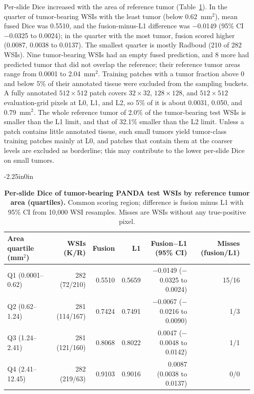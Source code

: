 \documentclass[10pt,letterpaper]{article}
\begin{document}
Per-slide Dice increased with the area of reference tumor (Table~\ref{tab:size}). In the quarter of tumor-bearing WSIs with the least tumor (below 0.62~mm$^2$), mean fused Dice was 0.5510, and the fusion-minus-L1 difference was $-$0.0149 (95\% CI $-$0.0325 to 0.0024); in the quarter with the most tumor, fusion scored higher (0.0087, 0.0038 to 0.0137). The smallest quarter is mostly Radboud (210 of 282 WSIs). Nine tumor-bearing WSIs had an empty fused prediction, and 8 more had predicted tumor that did not overlap the reference; their reference tumor areas range from 0.0001 to 2.04~mm$^2$. Training patches with a tumor fraction above 0 and below 5\% of their annotated tissue were excluded from the sampling buckets. A fully annotated $512\times512$ patch covers $32\times32$, $128\times128$, and $512\times512$ evaluation-grid pixels at L0, L1, and L2, so 5\% of it is about 0.0031, 0.050, and 0.79~mm$^2$. The whole reference tumor of 2.0\% of the tumor-bearing test WSIs is smaller than the L1 limit, and that of 32.1\% smaller than the L2 limit. Unless a patch contains little annotated tissue, such small tumors yield tumor-class training patches mainly at L0, and patches that contain them at the coarser levels are excluded as borderline; this may contribute to the lower per-slide Dice on small tumors.

\begin{table}[H]\begin{adjustwidth}{-2.25in}{0in}\centering
\caption{\textbf{Per-slide Dice of tumor-bearing PANDA test WSIs by reference tumor area (quartiles).} Common scoring region; difference is fusion minus L1 with 95\% CI from 10,000 WSI resamples. Misses are WSIs without any true-positive pixel.}\label{tab:size}
\begin{tabular}{lrrrrrr}\toprule
Area quartile (mm$^2$) & WSIs (K/R) & Fusion & L1 & Fusion$-$L1 (95\% CI) & Misses (fusion/L1)\\\midrule
Q1 (0.0001--0.62) & 282 (72/210) & 0.5510 & 0.5659 & $-$0.0149 ($-$0.0325 to 0.0024) & 15/16\\
Q2 (0.62--1.24) & 281 (114/167) & 0.7424 & 0.7491 & $-$0.0067 ($-$0.0216 to 0.0090) & 1/3\\
Q3 (1.24--2.41) & 281 (121/160) & 0.8068 & 0.8022 & 0.0047 ($-$0.0048 to 0.0142) & 1/1\\
Q4 (2.41--12.45) & 282 (219/63) & 0.9103 & 0.9016 & 0.0087 (0.0038 to 0.0137) & 0/0\\
\bottomrule
\end{tabular}\end{adjustwidth}\end{table}
\end{document}
